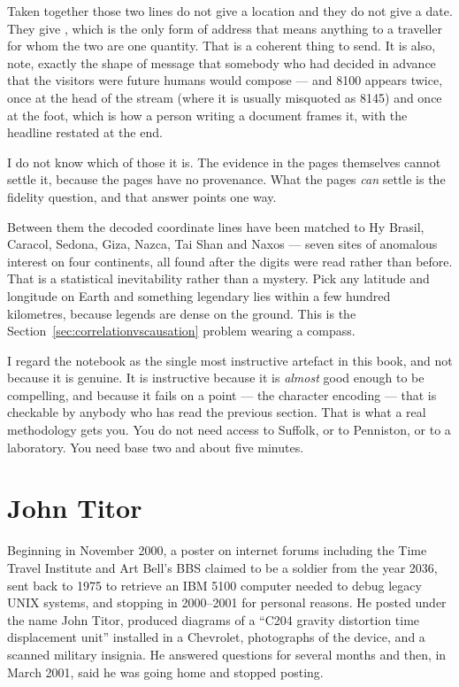 Taken together those two lines do not give a location and they do not give a date. They give
, which is the only form of address that means anything to
a traveller for whom the two are one quantity. That is a coherent thing to send. It is also,
note, exactly the shape of message that somebody who had decided in advance that the visitors
were future humans would compose --- and 8100 appears twice, once at the head of the stream
(where it is usually misquoted as 8145) and once at the foot, which is how a person writing a
document frames it, with the headline restated at the end.

I do not know which of those it is. The evidence in the pages themselves cannot settle it,
because the pages have no provenance. What the pages \emph{can} settle is the fidelity question,
and that answer points one way.

\begin{funfact}
Between them the decoded coordinate lines have been matched to Hy Brasil, Caracol, Sedona,
Giza, Nazca, Tai Shan and Naxos --- seven sites of anomalous interest on four continents, all
found after the digits were read rather than before. That is a statistical inevitability rather
than a mystery. Pick any latitude and longitude on Earth and something legendary lies within a
few hundred kilometres, because legends are dense on the ground. This is the
Section~\ref{sec:correlationvscausation} problem wearing a compass.
\end{funfact}

I regard the notebook as the single most instructive artefact in this book, and not because
it is genuine. It is instructive because it is \emph{almost} good enough to be compelling,
and because it fails on a point --- the character encoding --- that is checkable by anybody
who has read the previous section. That is what a real methodology gets you. You do not
need access to Suffolk, or to Penniston, or to a laboratory. You need base two and about
five minutes.

\section{John Titor}\label{sec:johntitor}

Beginning in November 2000, a poster on internet forums including the Time Travel Institute
and Art Bell's BBS claimed to be a soldier from the year 2036, sent back to 1975 to retrieve
an IBM 5100 computer needed to debug legacy UNIX systems, and stopping in 2000--2001 for
personal reasons. He posted under the name John Titor, produced diagrams of a
``C204 gravity distortion time displacement unit'' installed in a Chevrolet, photographs of
the device, and a scanned military insignia. He answered questions for several months and
then, in March 2001, said he was going home and stopped posting.

